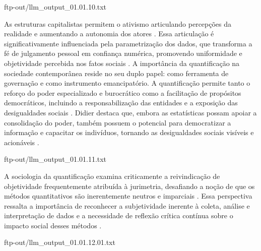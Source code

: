\begin{agradecimentos}
    ftp-out/llm_output_01.01.10.txt 
    
    As estruturas capitalistas permitem o ativismo articulando percepções da realidade e aumentando a autonomia dos atores \cite{didier2021}. Essa articulação é significativamente influenciada pela parametrização dos dados, que transforma a fé de julgamento pessoal em confiança numérica, promovendo uniformidade e objetividade percebida nos fatos sociais \cite{vernant2006}. A importância da quantificação na sociedade contemporânea reside no seu duplo papel: como ferramenta de governação e como instrumento emancipatório. A quantificação permite tanto o reforço do poder especializado e burocrático como a facilitação de propósitos democráticos, incluindo a responsabilização das entidades e a exposição das desigualdades sociais \cite{demortain2019,didier2021,paiva2021}. Didier destaca que, embora as estatísticas possam apoiar a consolidação do poder, também possuem o potencial para democratizar a informação e capacitar os indivíduos, tornando as desigualdades sociais visíveis e acionáveis \cite{didier2021}. 
    
    ftp-out/llm_output_01.01.11.txt 
    
    A sociologia da quantificação examina criticamente a reivindicação de objetividade frequentemente atribuída à jurimetria, desafiando a noção de que os métodos quantitativos são inerentemente neutros e imparciais \cite{10.1590/dados.2022.65. 3.267,10.1057/s41599-020-00557-0}. Essa perspectiva ressalta a importância de reconhecer a subjetividade inerente à coleta, análise e interpretação de dados e a necessidade de reflexão crítica contínua sobre o impacto social desses métodos \cite{10.5040/9781350220645,10.1080/07329113.2015.1046739}. 
    
    ftp-out/llm_output_01.01.12.01.txt 
    

\end{agradecimentos}
